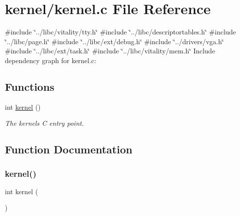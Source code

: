 \hypertarget{a00038}{}\section{kernel/kernel.c File Reference}
\label{a00038}
{\ttfamily \#include \char`\"{}../libc/vitality/tty.\+h\char`\"{}}\newline
{\ttfamily \#include \char`\"{}../libc/descriptortables.\+h\char`\"{}}\newline
{\ttfamily \#include \char`\"{}../libc/page.\+h\char`\"{}}\newline
{\ttfamily \#include \char`\"{}../libc/ext/debug.\+h\char`\"{}}\newline
{\ttfamily \#include \char`\"{}../drivers/vga.\+h\char`\"{}}\newline
{\ttfamily \#include \char`\"{}../libc/ext/task.\+h\char`\"{}}\newline
{\ttfamily \#include \char`\"{}../libc/vitality/mem.\+h\char`\"{}}\newline
Include dependency graph for kernel.\+c\+:
\subsection*{Functions}
\begin{DoxyCompactItemize}
\item 
int \hyperlink{a00038_a4ee3d1f05046b7afc6b4d516bf10667a_a4ee3d1f05046b7afc6b4d516bf10667a}{kernel} ()
\begin{DoxyCompactList}\small\item\em The kernels C entry point. \end{DoxyCompactList}\end{DoxyCompactItemize}


\subsection{Function Documentation}
\mbox{\label{a00038_a4ee3d1f05046b7afc6b4d516bf10667a_a4ee3d1f05046b7afc6b4d516bf10667a}} 
\subsubsection{\texorpdfstring{kernel()}{kernel()}}
{\footnotesize\ttfamily int kernel (\begin{DoxyParamCaption}{ }\end{DoxyParamCaption})}



